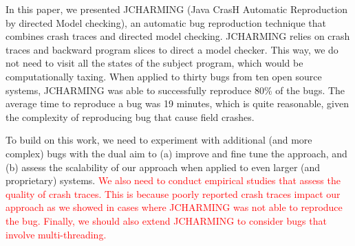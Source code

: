 \documentclass[times, doublespace]{smrauth}
\newcommand{\red}[1]{\textcolor{red}{#1}}
\begin{document}
In this paper, we presented JCHARMING (Java CrasH Automatic
Reproduction by directed Model checking), an automatic bug
reproduction technique that combines crash traces and
directed model checking. JCHARMING relies on crash traces and backward program slices to direct a model checker. This way, we do not need to visit all the states of the subject program, which would be computationally taxing.  When applied to thirty bugs from ten open source systems, JCHARMING was able to successfully reproduce 80\% of the bugs. The average time to reproduce a bug was 19 minutes, which is quite reasonable, given the complexity of reproducing bug that cause field crashes.

To build on this work, we need to experiment with additional
(and more complex) bugs with the dual aim to (a) improve and
fine tune the approach, and (b) assess the scalability of our
approach when applied to even larger (and proprietary)
systems. \red{We also need to conduct empirical studies that assess the quality of crash traces. This is because poorly reported crash traces impact our approach as we showed in cases where JCHARMING was not able to reproduce the bug. Finally, we should also extend JCHARMING to consider bugs that involve multi-threading.}



\end{document}
